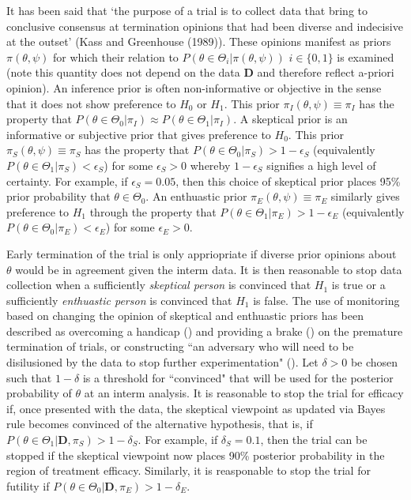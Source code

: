 \documentclass[12pt]{article}
\begin{document}
It has been said that `the purpose of a trial is to collect data that bring to conclusive consensus at termination opinions that had been diverse and indecisive at the outset' (Kass and Greenhouse (1989)). These opinions manifest as priors $\pi(\theta,\psi)$ for which their relation to $P(\theta\in\Theta_i|\pi(\theta,\psi))$ $i\in\{0,1\}$ is examined (note this quantity does not depend on the data $\mathbf{D}$ and therefore reflect a-priori opinion). An inference prior is often non-informative or objective in the sense that it does not show preference to $H_0$ or $H_1$. This prior $\pi_{I}(\theta,\psi)\equiv\pi_{I}$ has the property that $P(\theta\in\Theta_0|\pi_I)\approx P(\theta\in\Theta_1|\pi_I)$. A skeptical prior is an informative or subjective prior that gives preference to $H_0$. This prior $\pi_{S}(\theta,\psi)\equiv\pi_{S}$ has the property that $P(\theta\in\Theta_0| \pi_{S})>1-\epsilon_S$ (equivalently $P(\theta\in\Theta_1| \pi_{S})<\epsilon_S$) for some $\epsilon_S>0$ whereby $1-\epsilon_S$ signifies a high level of certainty. For example, if $\epsilon_S=0.05$, then this choice of skeptical prior places 95\% prior probability that $\theta\in\Theta_0$. An enthuastic prior $\pi_{E}(\theta,\psi)\equiv\pi_{E}$ similarly gives preference to $H_1$ through the property that $P(\theta\in\Theta_1| \pi_{E})>1-\epsilon_E$ (equivalently $P(\theta\in\Theta_0| \pi_{E})<\epsilon_E$) for some $\epsilon_E>0$.

Early termination of the trial is only appriopriate if diverse prior opinions about $\theta$ would be in agreement given the interm data. It is then reasonable to stop data collection when a sufficiently \textit{skeptical person} is convinced that $H_1$ is true or a sufficiently \textit{enthuastic person} is convinced that $H_1$ is false. The use of monitoring based on changing the opinion of skeptical and enthuastic priors has been described as overcoming a handicap (\cite{Freedman1989}) and providing a brake (\cite{Fayers1997}) on the premature termination of trials, or constructing ``an adversary who will need to be disilusioned by the data to stop further experimentation" (\cite{Spiegelhalter1994}). Let $\delta>0$ be chosen such that $1-\delta$ is a threshold for ``convinced" that will be used for the posterior probability of $\theta$ at an interm analysis. It is reasonable to stop the trial for efficacy if, once presented with the data, the skeptical viewpoint as updated via Bayes rule becomes convinced of the alternative hypothesis, that is, if $P(\theta\in\Theta_1|\mathbf{D}, \pi_{S})>1-\delta_S$. For example, if $\delta_S=0.1$, then the trial can be stopped if the skeptical viewpoint now places 90\% posterior probability in the region of treatment efficacy. Similarly, it is reasponable to stop the trial for futility if $P(\theta\in\Theta_0|\mathbf{D}, \pi_{E})>1-\delta_E$.
\end{document}
